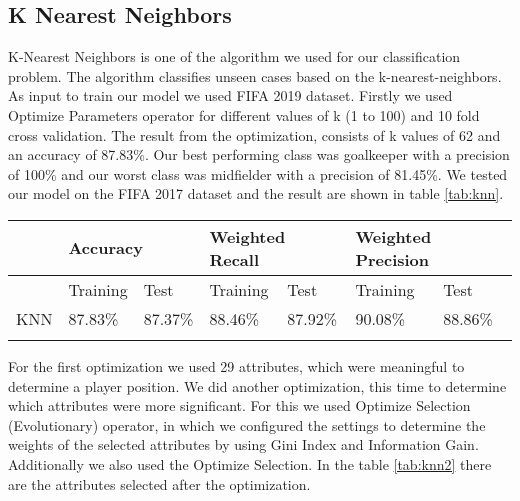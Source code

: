 \subsection{K Nearest Neighbors}
K-Nearest Neighbors is one of the algorithm we used for our classification problem. 
The algorithm classifies unseen cases based on the k-nearest-neighbors. As input to train our model we used FIFA 2019 dataset. Firstly we used Optimize Parameters operator for different values of k (1 to 100) and 10 fold cross validation. The result from the optimization, consists of k values of 62 and an accuracy of 87.83\%. Our best performing class was goalkeeper with a precision of 100\% and our worst class was midfielder with a precision of 81.45\%. We tested our model on the FIFA 2017 dataset and the result are shown in table \ref{tab:knn}.\\


\bigskip 
\begin{tabular}{lll|ll|ll}
\hline 
 & \multicolumn{2}{l|}{Accuracy} & \multicolumn{2}{l|}{Weighted Recall \hspace{1cm} } & \multicolumn{2}{l}{Weighted Precision}\\ 
\hline 
 & Training  \hspace{0.3cm} & Test \hspace{0.2cm} & Training \hspace{0.3cm}  & Test \hspace{0.1cm} & Training \hspace{0.3cm}  & Test \\ 
\hline 
KNN \hspace{0.5cm} & 87.83\%	 & 87.37\%  \hspace{0.1cm} & 88.46\% & 87.92\% & 90.08\% & 88.86\% \\ 
\hline 
\label{tab:knn}
\end{tabular} 

For the first optimization we used 29 attributes, which were meaningful to determine a player position. We did another optimization, this time to determine which attributes were more significant. For this we used Optimize Selection (Evolutionary) operator, in which we configured the settings to determine the weights of the selected attributes by using Gini Index and Information Gain. Additionally we also used the Optimize Selection. In the table \ref{tab:knn2} there are the attributes selected after the optimization.


